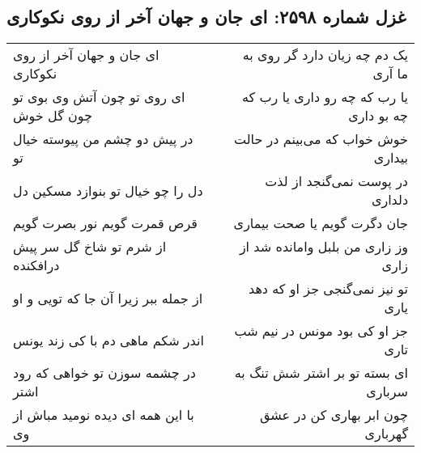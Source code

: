 \begin{center}
\section*{غزل شماره ۲۵۹۸: ای جان و جهان آخر از روی نکوکاری}
\label{sec:2598}
\begin{longtable}{l p{0.5cm} r}
ای جان و جهان آخر از روی نکوکاری
&&
یک دم چه زیان دارد گر روی به ما آری
\\
ای روی تو چون آتش وی بوی تو چون گل خوش
&&
یا رب که چه رو داری یا رب که چه بو داری
\\
در پیش دو چشم من پیوسته خیال تو
&&
خوش خواب که می‌بینم در حالت بیداری
\\
دل را چو خیال تو بنوازد مسکین دل
&&
در پوست نمی‌گنجد از لذت دلداری
\\
قرص قمرت گویم نور بصرت گویم
&&
جان دگرت گویم یا صحت بیماری
\\
از شرم تو شاخ گل سر پیش درافکنده
&&
وز زاری من بلبل وامانده شد از زاری
\\
از جمله ببر زیرا آن جا که تویی و او
&&
تو نیز نمی‌گنجی جز او که دهد یاری
\\
اندر شکم ماهی دم با کی زند یونس
&&
جز او کی بود مونس در نیم شب تاری
\\
در چشمه سوزن تو خواهی که رود اشتر
&&
ای بسته تو بر اشتر شش تنگ به سرباری
\\
با این همه ای دیده نومید مباش از وی
&&
چون ابر بهاری کن در عشق گهرباری
\\
\end{longtable}
\end{center}
